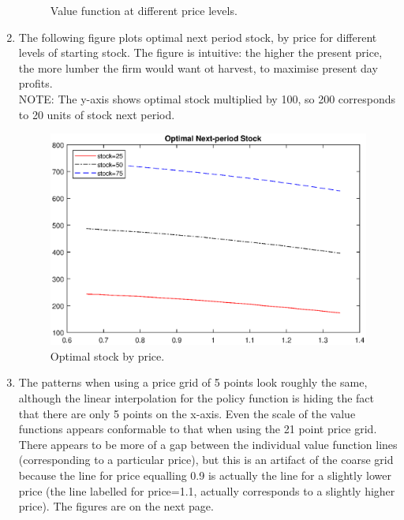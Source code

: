 \documentclass[12pt,a4paper]{article}
\begin{document}
\begin{enumerate}[1.]
\begin{figure}[h]
\caption{Value function at different price levels.}
\end{figure}
\item The following figure plots optimal next period stock, by price for different levels of starting stock. The figure is intuitive: the higher the present price, the more lumber the firm would want ot harvest, to maximise present day profits. \\
NOTE: The y-axis shows optimal stock multiplied by 100, so 200 corresponds to 20 units of stock next period. 

\begin{figure}[h]
\includegraphics[width=\textwidth]{stock.eps}\vspace{-3ex}
\caption{Optimal stock by price.}
\end{figure}
\item The patterns when using a price grid of 5 points look roughly the same, although the linear interpolation for the policy function is hiding the fact that there are only 5 points on the x-axis. Even the scale of the value functions appears conformable to that when using the 21 point price grid. There appears to be more of a gap between the individual value function lines (corresponding to a particular price), but this is an artifact of the coarse grid because the line for price equalling 0.9 is actually the line for a slightly lower price (the line labelled for price=1.1, actually corresponds to a slightly higher price). The figures are on the next page.
\begin{figure}[h]

\end{figure}
\end{enumerate}
\end{document}
